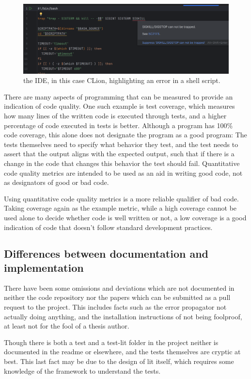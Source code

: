 \begin{figure}[h]
    \centering
    \includegraphics[width=0.5\linewidth]{Images/IDE_highlighting.png}
    \caption{the IDE, in this case CLion, highlighting an error in a shell script.}
    \label{fig:IDE_highlighting}
\end{figure}

There are many aspects of programming that can be measured to provide an indication of code quality. One such example is test coverage, which measures how many lines of the written code is executed through tests, and a higher percentage of code executed in tests is better. Although a program has 100\% code coverage, this alone does not designate the program as a good program: The tests themselves need to specify what behavior they test, and the test needs to assert that the output aligns with the expected output, such that if there is a change in the code that changes this behavior the test should fail. Quantitative code quality metrics are intended to be used as an aid in writing good code, not as designators of good or bad code. 

Using quantitative code quality metrics is a more reliable qualifier of bad code. Taking coverage again as the example metric, while a high coverage cannot be used alone to decide whether code is well written or not, a low coverage is a good indication of code that doesn't follow standard development practices.  


\subsection{Differences between documentation and implementation}

There have been some omissions and deviations which are not documented in neither the code repository nor the papers which can be submitted as a pull request to the \taffo{} project. 
This includes facts such as the error propagator not actually doing anything, and the installation instructions of \taffo{} not being foolproof, at least not for the fool of a thesis author.

Though there is both a test and a test-lit folder in the \taffo{} project neither is documented in the readme or elsewhere, and the tests themselves are cryptic at best. This last fact may be due to the design of lit itself, which requires some knowledge of the framework to understand the tests. 

